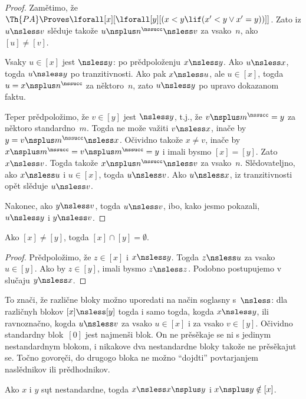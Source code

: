 \documentclass[../../../include/open-logic-section]{subfiles}
\begin{document}
\begin{proof}
Zamětimo, že $\Th{PA} \Proves \lforall[x][\lforall[y][(x < y \lif
(x' < y \lor x' = y))]]$. Zato iz $u \nsless v$ slěduje takože
$u \nsplus n^\nssucc \nsless v$ za vsako~$n$, ako $[u] \neq [v]$.

Vsaky $u \in [x]$ jest $\nsless y$: po prědpoloženju $x \nsless y$.
Ako $u \nsless x$, togda $u \nsless y$ po tranzitivnosti. Ako pak
$x \nsless u$, ale $u \in [x]$, togda $u = x\nsplus n^\nssucc$ za
něktoro~$n$, zato $u \nsless y$ po upravo dokazanom faktu.

Teper prědpoložimo, že $v \in [y]$ jest $\nsless y$, t.j., že
$v \nsplus m^\nssucc = y$ za něktoro standardno~$m$. Togda ne može
važiti $v \nsless x$, inače by $y = v \nsplus m^\nssucc \nsless x$.
Očividno takože $x \neq v$, inače by $x \nsplus m^\nssucc =
v \nsplus m^\nssucc = y$ i imali bysmo $[x] = [y]$. Zato
$x \nsless v$. Togda takože $x \nsplus n^\nssucc \nsless v$ za
vsako~$n$. Slědovateljno, ako $x \nsless u$ i $u \in [x]$, togda
$u \nsless v$. Ako $u \nsless x$, iz tranzitivnosti opět slěduje
$u \nsless v$.

Nakonec, ako $y \nsless v$, togda $u \nsless v$, ibo, kako jesmo
pokazali, $u \nsless y$ i $y \nsless v$.
\end{proof}

\begin{cor}
Ako $[x] \neq [y]$, togda $[x] \cap [y] = \emptyset$.
\end{cor}

\begin{proof}
Prědpoložimo, že $z \in [x]$ i $x \nsless y$. Togda $z \nsless u$ za
vsako $u \in [y]$. Ako by $z \in [y]$, imali bysmo $z \nsless z$.
Podobno postupujemo v slučaju $y \nsless x$.
\end{proof}

\begin{explain}
To znači, že različne bloky možno uporedati na način soglasny
s~$\nsless$: dla različnyh blokov $[x] \nsless [y]$ togda i samo
togda, kogda $x \nsless y$, ili ravnoznačno, kogda $u \nsless v$ za
vsako $u \in [x]$ i za vsako $v \in [y]$. Očividno standardny blok~$[0]$ jest
najmenši blok. On ne prěsěkaje se ni s jedinym nestandardnym blokom, i
nikakove dva nestandardne bloky takože ne prěsěkajut se. Točno govoręči,
do drugogo bloka ne možno ``dojdti'' povtarjanjem naslědnikov ili
prědhodnikov.
\end{explain}

\begin{prop}
Ako $x$ i $y$ sųt nestandardne, togda $x \nsless x \nsplus y$ i
$x \nsplus y \notin [x]$.
\end{prop}
\end{document}
